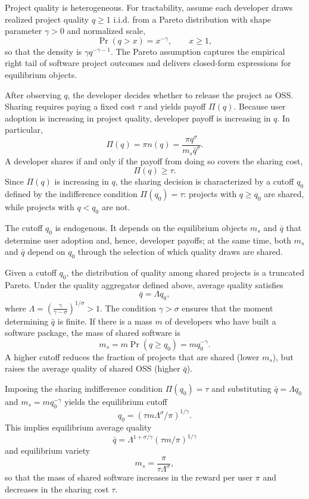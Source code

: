 \documentclass[11pt,a4paper]{article}
\theoremstyle{definition}
\theoremstyle{remark}
\begin{document}
Project quality is heterogeneous. For tractability, assume each
developer draws realized project quality \(q \ge 1\) i.i.d. from a
Pareto distribution with shape parameter \(\gamma>0\) and normalized
scale, \[
\Pr(q>x) = x^{-\gamma}, \qquad x\ge 1,
\] so that the density is \(\gamma q^{-\gamma-1}\). The Pareto
assumption captures the empirical right tail of software project
outcomes and delivers closed-form expressions for equilibrium objects.

After observing \(q\), the developer decides whether to release the
project as OSS. Sharing requires paying a fixed cost \(\tau\) and yields
payoff \(\Pi(q)\). Because user adoption is increasing in project
quality, developer payoff is increasing in \(q\). In particular, \[
\Pi(q) = \pi n(q) = \frac{\pi q^\sigma}{m_s \bar q^\sigma}.
\] A developer shares if and only if the payoff from doing so covers the
sharing cost, \[
\Pi(q) \ge \tau.
\] Since \(\Pi(q)\) is increasing in \(q\), the sharing decision is
characterized by a cutoff \(q_0\) defined by the indifference condition
\(\Pi(q_0)=\tau\): projects with \(q\ge q_0\) are shared, while projects
with \(q<q_0\) are not.

The cutoff \(q_0\) is endogenous. It depends on the equilibrium objects
\(m_s\) and \(\bar q\) that determine user adoption and, hence,
developer payoffs; at the same time, both \(m_s\) and \(\bar q\) depend
on \(q_0\) through the selection of which quality draws are shared.

Given a cutoff \(q_0\), the distribution of quality among shared
projects is a truncated Pareto. Under the quality aggregator defined
above, average quality satisfies \[
\bar q = \Lambda q_0,
\] where
\(\Lambda = \left(\frac{\gamma}{\gamma-\sigma}\right)^{1/\sigma} > 1\).
The condition \(\gamma>\sigma\) ensures that the moment determining
\(\bar q\) is finite. If there is a mass \(m\) of developers who have
built a software package, the mass of shared software is \[
m_s = m\Pr(q\ge q_0) = m q_0^{-\gamma}.
\] A higher cutoff reduces the fraction of projects that are shared
(lower \(m_s\)), but raises the average quality of shared OSS (higher
\(\bar q\)).

Imposing the sharing indifference condition \(\Pi(q_0)=\tau\) and
substituting \(\bar q=\Lambda q_0\) and \(m_s=m q_0^{-\gamma}\) yields
the equilibrium cutoff \[
q_0 = (\tau m \Lambda^\sigma /\pi)^{1/\gamma}.
\] This implies equilibrium average quality \[
\bar q = \Lambda^{1+\sigma/\gamma}(\tau m/\pi)^{1/\gamma}
\] and equilibrium variety \[
m_s = \frac{\pi}{\tau \Lambda^{\sigma}},
\] so that the mass of shared software increases in the reward per user
\(\pi\) and decreases in the sharing cost \(\tau\).
\end{document}
